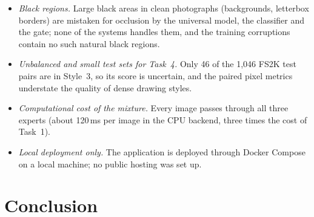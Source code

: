 \documentclass[conference]{IEEEtran}
\begin{document}
\begin{itemize}
  and the specialists of Task~2 are not better than the universal model; the
  comparison between them is also not fully controlled (different search
  sizes, epochs and bottleneck widths).
  \item \emph{Black regions.} Large black areas in clean photographs
  (backgrounds, letterbox borders) are mistaken for occlusion by the
  universal model, the classifier and the gate; none of the systems handles
  them, and the training corruptions contain no such natural black regions.
  \item \emph{Unbalanced and small test sets for Task~4.} Only 46 of the
  1,046 FS2K test pairs are in Style~3, so its score is uncertain, and the
  paired pixel metrics understate the quality of dense drawing styles.
  \item \emph{Computational cost of the mixture.} Every image passes through
  all three experts (about 120\,ms per image in the CPU backend, three times
  the cost of Task~1).
  \item \emph{Local deployment only.} The application is deployed through
  Docker Compose on a local machine; no public hosting was set up.
\end{itemize}

\section{Conclusion}
\label{sec:conclusion}
\end{document}
